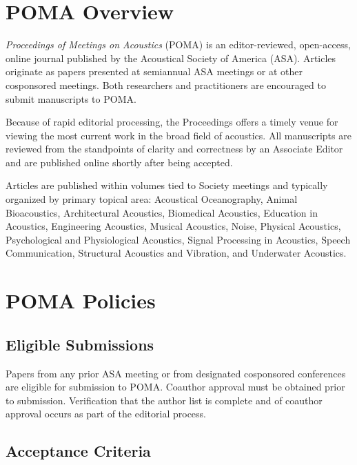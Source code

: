 \documentclass[12pt,letter]{article}
\begin{document}
\section{POMA Overview}

\textsl{Proceedings of Meetings on Acoustics} (POMA) is an editor-reviewed, open-access, online journal published by the Acoustical Society of America (ASA). Articles originate as papers presented at semiannual ASA meetings or at other cosponsored meetings. Both researchers and practitioners are encouraged to submit manuscripts to POMA. 

Because of rapid editorial processing, the Proceedings offers a timely venue for viewing the most current work in the broad field of acoustics. All manuscripts are reviewed from the standpoints of clarity and correctness by an Associate Editor and are published online shortly after being accepted.  

Articles are published within volumes tied to Society meetings and typically organized by primary topical area: Acoustical Oceanography, Animal Bioacoustics, Architectural Acoustics, Biomedical Acoustics, Education in Acoustics, Engineering Acoustics, Musical Acoustics, Noise, Physical Acoustics, Psychological and Physiological Acoustics, Signal Processing in Acoustics, Speech Communication, Structural Acoustics and Vibration, and Underwater Acoustics.


\section{POMA Policies}

\subsection{Eligible Submissions}

Papers from any prior ASA meeting or from designated cosponsored conferences are eligible for submission to POMA. Coauthor approval must be obtained prior to submission. Verification that the author list is complete and of coauthor approval occurs as part of the editorial process.

\subsection{Acceptance Criteria}
\end{document}
